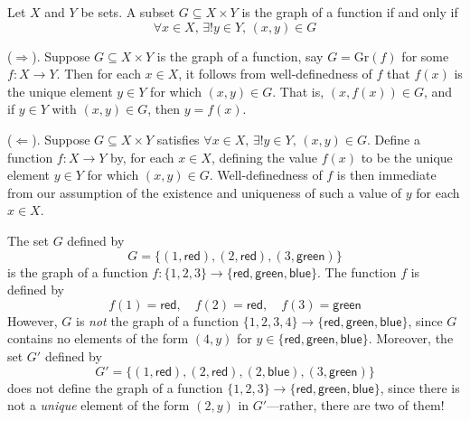 \begin{theorem}
\label{thmFunctionsAsGraphs}
Let $X$ and $Y$ be sets. A subset $G \subseteq X \times Y$ is the graph of a function if and only if
\[ \forall x \in X,\, \exists ! y \in Y,\, (x,y) \in G \]
\end{theorem}
\begin{cproof}
($\Rightarrow$). Suppose $G \subseteq X \times Y$ is the graph of a function, say $G = \mathrm{Gr}(f)$ for some $f : X \to Y$. Then for each $x \in X$, it follows from well-definedness of $f$ that $f(x)$ is the unique element $y \in Y$ for which $(x, y) \in G$. That is, $(x,f(x)) \in G$, and if $y \in Y$ with $(x,y) \in G$, then $y=f(x)$.

($\Leftarrow$). Suppose $G \subseteq X \times Y$ satisfies $\forall x \in X,\, \exists ! y \in Y,\, (x,y) \in G$. Define a function $f : X \to Y$ by, for each $x \in X$, defining the value $f(x)$ to be the unique element $y \in Y$ for which $(x,y) \in G$. Well-definedness of $f$ is then immediate from our assumption of the existence and uniqueness of such a value of $y$ for each $x \in X$.
\end{cproof}

\begin{example}
The set $G$ defined by
\[ G = \{ (1, \mathsf{red}), (2, \mathsf{red}), (3, \mathsf{green}) \} \]
is the graph of a function $f : \{ 1, 2, 3 \} \to \{ \mathsf{red}, \mathsf{green}, \mathsf{blue} \}$. The function $f$ is defined by
\[ f(1) = \mathsf{red}, \quad f(2) = \mathsf{red}, \quad f(3) = \mathsf{green} \]
However, $G$ is \textit{not} the graph of a function $\{ 1, 2, 3, 4 \} \to \{ \mathsf{red}, \mathsf{green}, \mathsf{blue} \}$, since $G$ contains no elements of the form $(4,y)$ for $y \in \{ \mathsf{red}, \mathsf{green}, \mathsf{blue} \}$. Moreover, the set $G'$ defined by
\[ G' = \{ (1, \mathsf{red}), (2, \mathsf{red}), (2, \mathsf{blue}), (3, \mathsf{green}) \} \]
does not define the graph of a function $\{ 1, 2, 3 \} \to \{ \mathsf{red}, \mathsf{green}, \mathsf{blue} \}$, since there is not a \textit{unique} element of the form $(2,y)$ in $G'$---rather, there are two of them!
\end{example}

